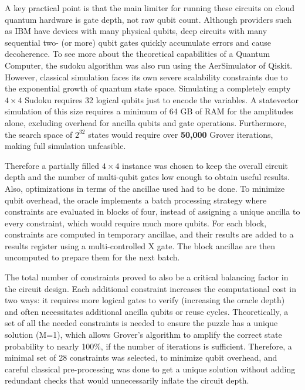 \vspace{1em}
\noindent A key practical point is that the main limiter for running these circuits on cloud quantum hardware is gate depth, not raw qubit count. Although providers such as IBM have devices with many physical qubits, deep circuits with many sequential two- (or more) qubit gates quickly accumulate errors and cause decoherence. To see more about the theoretical capabilities of a Quantum Computer, the sudoku algorithm was also run using the AerSimulator of Qiskit. However, classical simulation faces its own severe scalability constraints due to the exponential growth of quantum state space. Simulating a completely empty $4\times 4$ Sudoku requires 32 logical qubits just to encode the variables. A statevector simulation of this size requires a minimum of 64 GB of RAM for the amplitudes alone, excluding overhead for ancilla qubits and gate operations. Furthermore, the search space of \(2^{32}\) states would require over \textbf{50,000} Grover iterations, making full simulation unfeasible.

\vspace{1em}
\noindent Therefore a partially filled $4\times 4$ instance was chosen to keep the overall circuit depth and the number of multi-qubit gates low enough to obtain useful results. Also, optimizations in terms of the ancillae used had to be done. To minimize qubit overhead, the oracle implements a batch processing strategy where constraints are evaluated in blocks of four, instead of assigning a unique ancilla to every constraint, which would require much more qubits. For each block, constraints are computed in temporary ancillae, and their results are added to a results register using a multi-controlled X gate. The block ancillae are then uncomputed to prepare them for the next batch.

\vspace{1em}
\noindent
The total number of constraints proved to also be a critical balancing factor in the circuit design. Each additional constraint increases the computational cost in two ways: it requires more logical gates to verify (increasing the oracle depth) and often necessitates additional ancilla qubits or reuse cycles. Theoretically, a set of all the needed constraints is needed to ensure the puzzle has a unique solution (M=1), which allows Grover’s algorithm to amplify the correct state probability to nearly 100\%, if the number of iterations is sufficient. Therefore, a minimal set of 28 constraints was selected, to minimize qubit overhead, and careful classical pre-processing was done to get a unique solution without adding redundant checks that would unnecessarily inflate the circuit depth.

